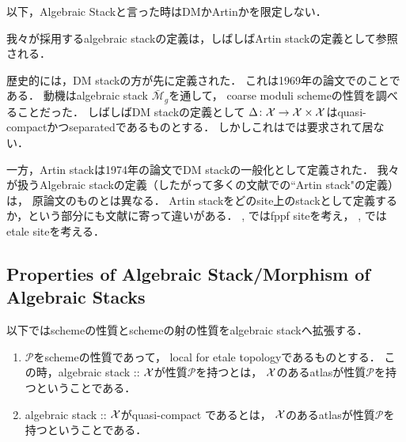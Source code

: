     \rest
    以下，Algebraic Stackと言った時はDMかArtinかを限定しない．
    \begin{Remark}
        我々が採用するalgebraic stackの定義は，しばしばArtin stackの定義として参照される．

        歴史的には，DM stackの方が先に定義された．
        これは1969年の論文\cite{DM69}でのことである．
        動機はalgebraic stack $\bar{\mathscr{M}}_g$を通して，
        coarse moduli schemeの性質を調べることだった．
        しばしばDM stackの定義として
        $\Delta \colon \mathcal{X} \to \mathcal{X} \times \mathcal{X}$はquasi-compactかつseparatedであるものとする．
        しかしこれは\cite{DM69}では要求されて居ない．

        一方，Artin stackは1974年の論文\cite{Artin74}でDM stackの一般化として定義された．
        我々が扱うAlgebraic stackの定義（したがって多くの文献での``Artin stack"の定義）は，
        原論文のものとは異なる．
        Artin stackをどのsite上のstackとして定義するか，という部分にも文献に寄って違いがある．
        \cite{Artin74}, \cite{SP}ではfppf siteを考え，
        \cite{LMB}, \cite{Olsson16}ではetale siteを考える．
    \end{Remark}
    \rest

\subsection{Properties of Algebraic Stack/Morphism of Algebraic Stacks}
以下ではschemeの性質とschemeの射の性質をalgebraic stackへ拡張する．

\begin{Def}
    \enumfix
\begin{enumerate}
\item
    $\mathcal{P}$をschemeの性質であって，
    local for etale topologyであるものとする．
    この時，algebraic stack :: $\mathcal{X}$が性質$\mathcal{P}$を持つとは，
    $\mathcal{X}$のあるatlasが性質$\mathcal{P}$を持つということである．

\item
    algebraic stack :: $\mathcal{X}$がquasi-compact
    であるとは，
    $\mathcal{X}$のあるatlasが性質$\mathcal{P}$を持つということである．
\end{enumerate}
\end{Def}

